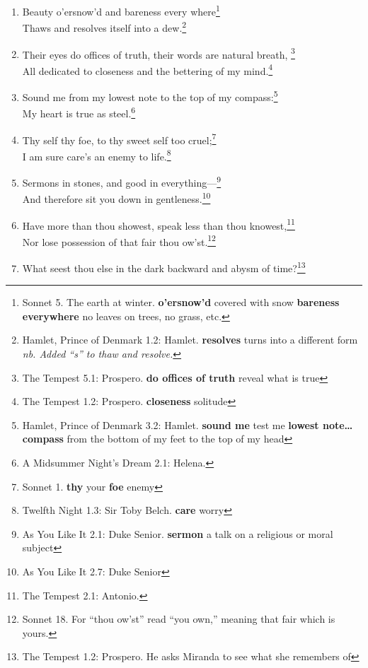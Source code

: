 \documentclass[17pt,twoside]{extarticle}
\begin{document}
\begin{enumerate}
  wheel!\footnote{King Lear 2.2: Kent. \textbf{Fortune} goddess of luck
    \textbf{smile} bring me good luck \textbf{thy} your \textbf{wheel}
    Fortune's wheel, which brings luck, misfortune, or neither.}
\item
  Beauty o'ersnow'd and bareness every where\footnote{Sonnet 5. The
    earth at winter. \textbf{o'ersnow'd} covered with snow
    \textbf{bareness everywhere} no leaves on trees, no grass, etc.}\\Thaws
  and resolves itself into a dew.\footnote{Hamlet, Prince of Denmark
    1.2: Hamlet. \textbf{resolves} turns into a different form \emph{nb.
    Added ``s'' to thaw and resolve.}}
\item
  Their eyes do offices of truth, their words are natural breath,
  \footnote{The Tempest 5.1: Prospero. \textbf{do offices of truth}
    reveal what is true}\\All dedicated to closeness and the bettering
  of my mind.\footnote{The Tempest 1.2: Prospero. \textbf{closeness}
    solitude}
\item
  Sound me from my lowest note to the top of my compass:\footnote{Hamlet,
    Prince of Denmark 3.2: Hamlet. \textbf{sound me} test me
    \textbf{lowest note\ldots{}compass} from the bottom of my feet to
    the top of my head}\\My heart is true as steel.\footnote{A Midsummer
    Night's Dream 2.1: Helena.}
\item
  Thy self thy foe, to thy sweet self too cruel;\footnote{Sonnet 1.
    \textbf{thy} your \textbf{foe} enemy}\\I am sure care's an enemy to
  life.\footnote{Twelfth Night 1.3: Sir Toby Belch. \textbf{care} worry}
\item
  Sermons in stones, and good in everything---\footnote{As You Like It
    2.1: Duke Senior. \textbf{sermon} a talk on a religious or moral
    subject}\\And therefore sit you down in gentleness.\footnote{As You
    Like It 2.7: Duke Senior}
\item
  Have more than thou showest, speak less than thou knowest,\footnote{The
    Tempest 2.1: Antonio.}\\Nor lose possession of that fair thou
  ow'st.\footnote{Sonnet 18. For ``thou ow'st'' read ``you own,''
    meaning that fair which is yours.}
\item
  What seest thou else in the dark backward and abysm of time?\footnote{The
    Tempest 1.2: Prospero. He asks Miranda to see what she remembers of
}
\end{enumerate}
\end{document}
